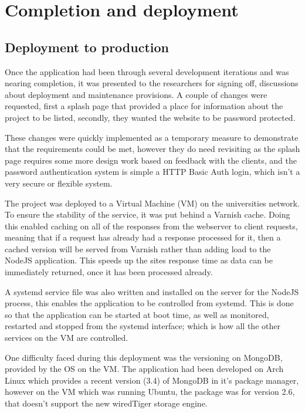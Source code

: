 \chapter{Completion and deployment}

\section{Deployment to production}
Once the application had been through several development iterations and was nearing completion, it was presented to the researchers for signing off, discussions about deployment and maintenance provisions. A couple of changes were requested, first a splash page that provided a place for information about the project to be listed, secondly, they wanted the website to be password protected. 

These changes were quickly implemented as a temporary measure to demonstrate that the requirements could be met, however they do need revisiting as the splash page requires some more design work based on feedback with the clients, and the password authentication system is simple a HTTP Basic Auth login, which isn't a very secure or flexible system. 

The project was deployed to a Virtual Machine (VM) on the universities network. To ensure the stability of the service, it was put behind a Varnish\cite{varnish} cache. Doing this enabled caching on all of the responses from the webserver to client requests, meaning that if a request has already had a response processed for it, then a cached version will be served from Varnish rather than adding load to the NodeJS application. This speeds up the sites response time as data can be immediately returned, once it has been processed already.

A systemd\cite{systemd} service file was also written and installed on the server for the NodeJS process, this enables the application to be controlled from systemd. This is done so that the application can be started at boot time, as well as monitored, restarted and stopped from the systemd interface; which is how all the other services on the VM are controlled.

One difficulty faced during this deployment was the versioning on MongoDB, provided by the OS on the VM. The application had been developed on Arch Linux which provides a recent version (3.4) of MongoDB in it's package manager, however on the VM which was running Ubuntu, the package was for version 2.6, that doesn't support the new wiredTiger\cite{tiger} storage engine. 

